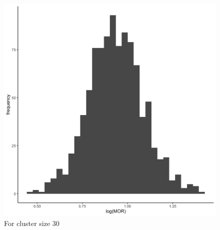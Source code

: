 \documentclass[
  letterpaper,
  DIV=11,
  numbers=noendperiod,
  titlepage]{scrartcl}
\begin{document}
\begin{figure}
\begin{minipage}[t]{0.50\linewidth}
{{\includegraphics{../../plots/two-lvl-ran-slope/low-prev/hist_50_30_two_lvl_slp_low_prev.png}

}

\caption{For cluster size 30}

}

\end{minipage}%
%
\begin{minipage}[t]{0.50\linewidth}

{\centering 

}
\end{minipage}
\end{figure}
\end{document}
